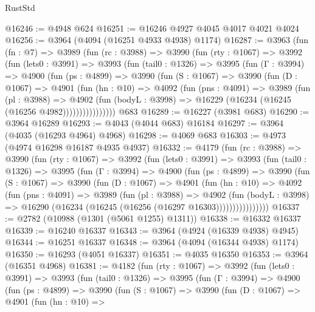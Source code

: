 \begin{lexlean}{RustStd}
\begin{coremodule}
{\begin{coremodule}
{{{{{{{{{{{{{{{{{{{{{{{{{{{{{{{{{{{{{{@16246 := @4948 @624
@16251 := @16246 @4927 @4045 @4017 @4021 @4024
@16256 := @3964 (@4094 (@16251 @4933 @4938) @1174)
@16287 := @3963
    (fun (fn : @7) =>
    @3989
      (fun (rc : @3988) =>
      @3990
        (fun (rty : @1067) =>
        @3992
          (fun (lets0 : @3991) =>
          @3993
            (fun (tail0 : @1326) =>
            @3995
              (fun (Γ : @3994) =>
              @4900
                (fun (ps : @4899) =>
                @3990
                  (fun (S : @1067) =>
                  @3990
                    (fun (D : @1067) =>
                    @4901
                      (fun (hn : @10) =>
                      @4092
                        (fun (pns : @4091) =>
                        @3989
                          (fun (pl : @3988) =>
                          @4902
                            (fun (bodyL : @3998) =>
                            @16229 (@16234 (@16245 (@16256 @4982))))))))))))))))
    @683
@16289 := @16227 (@3981 @683)
@16290 := @3964 @16289
@16293 := @4043 (@4044 @683) @16184
@16297 := @3964 (@4035 (@16293 @4964) @4968)
@16298 := @4069 @683
@16303 := @4973 (@4974 @16298 @16187 @4935 @4937)
@16332 := @4179
    (fun (rc : @3988) =>
    @3990
      (fun (rty : @1067) =>
      @3992
        (fun (lets0 : @3991) =>
        @3993
          (fun (tail0 : @1326) =>
          @3995
            (fun (Γ : @3994) =>
            @4900
              (fun (ps : @4899) =>
              @3990
                (fun (S : @1067) =>
                @3990
                  (fun (D : @1067) =>
                  @4901
                    (fun (hn : @10) =>
                    @4092
                      (fun (pns : @4091) =>
                      @3989
                        (fun (pl : @3988) =>
                        @4902
                          (fun (bodyL : @3998) =>
                          @16290 (@16234 (@16245 (@16256 (@16297 @16303))))))))))))))))
@16337 := @2782 (@10988 (@1301 (@5061 @1255) @1311))
@16338 := @16332 @16337
@16339 := @16240 @16337
@16343 := @3964 (@4924 (@16339 @4938) @4945)
@16344 := @16251 @16337
@16348 := @3964 (@4094 (@16344 @4938) @1174)
@16350 := @16293 (@4051 @16337)
@16351 := @4035 @16350
@16353 := @3964 (@16351 @4968)
@16381 := @4182
    (fun (rty : @1067) =>
    @3992
      (fun (lets0 : @3991) =>
      @3993
        (fun (tail0 : @1326) =>
        @3995
          (fun (Γ : @3994) =>
          @4900
            (fun (ps : @4899) =>
            @3990
              (fun (S : @1067) =>
              @3990
                (fun (D : @1067) =>
                @4901
                  (fun (hn : @10) =>
}}}}}}}}}}}}}}}}}}}}}}}}}}}}}}}}}}}}}}
\end{coremodule}}
\end{coremodule}
\end{lexlean}
